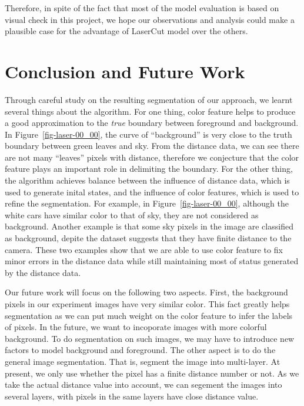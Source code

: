 \documentclass{article} %
\begin{document}
Therefore, in spite of the fact that most of the model evaluation is based on visual check in this project, we hope our observations and analysis could make a plausible case for the advantage of LaserCut model over the others.

\section{Conclusion and Future Work}

Through careful study on the resulting segmentation of our approach,
we learnt several things about the algorithm.
For one thing, color feature helps to produce a good approximation to the
\emph{true} boundary between foreground and background. 
In Figure~\ref{fig-laser-00_00}, the curve of ``background'' is very close to
the truth boundary between green leaves and sky. From the distance
data, we can see there are not many ``leaves'' pixels with distance,
therefore we conjecture that the color feature plays an important role
in delimiting the boundary.
For the other thing, the algorithm achieves balance between the
influence of distance data, which is used to generate inital states,
and the influence of color features, which is used to refine the
segmentation. 
For example, in Figure~\ref{fig-laser-00_00}, although the white cars have similar color
to that of sky, they are not considered as background.  
Another example is that some sky pixels in the image are classified
as background, depite the dataset suggests that they have finite
distance to the camera.  
These two examples show that we are able to use color feature to fix
minor errors in the distance data while still maintaining most of
status generated by the distance data.

Our future work will focus on the following two aspects.
First, the background pixels in our experiment images have very
similar color. This fact greatly helps segmentation as we can put much
weight on the color feature to infer the labels of pixels. In the
future, we want to incoporate images with more colorful
background. To do segmentation on such images, we may have to
introduce new factors to model background and foreground.
The other aspect is to do the general image segmentation. That is,
segment the image into multi-layer. At present, we only use whether
the pixel has a finite distance number or not. As we take the actual
distance value into account, we can segement the images into several
layers, with pixels in the same layers have close distance value.
\end{document}
